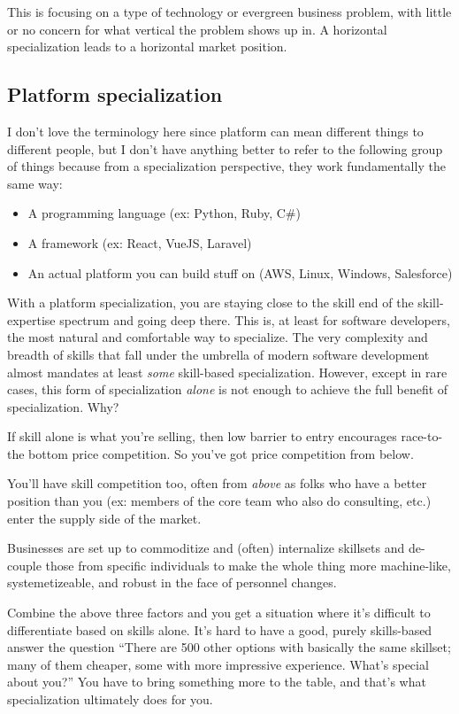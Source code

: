This is focusing on a type of technology or evergreen business problem, with little or no concern for what vertical the problem shows up in. A horizontal specialization leads to a horizontal market position.

\subsection{Platform specialization}

I don't love the terminology here since platform can mean different things to different people, but I don't have anything better to refer to the following group of things because from a specialization perspective, they work fundamentally the same way:

\begin{itemize}
\item A programming language (ex: Python, Ruby, C\#)
\item A framework (ex: React, VueJS, Laravel)
\item An actual platform you can build stuff on (AWS, Linux, Windows, Salesforce)
\end{itemize}

With a platform specialization, you are staying close to the skill end of the skill-expertise spectrum and going deep there. This is, at least for software developers, the most natural and comfortable way to specialize. The very complexity and breadth of skills that fall under the umbrella of modern software development almost mandates at least \emph{some} skill-based specialization. However, except in rare cases, this form of specialization \emph{alone} is not enough to achieve the full benefit of specialization. Why?

If skill alone is what you're selling, then low barrier to entry encourages race-to-the bottom price competition. So you've got price competition from below.

You'll have skill competition too, often from \emph{above} as folks who have a better position than you (ex: members of the core team who also do consulting, etc.) enter the supply side of the market.

Businesses are set up to commoditize and (often) internalize skillsets and de-couple those from specific individuals to make the whole thing more machine-like, systemetizeable, and robust in the face of personnel changes.

Combine the above three factors and you get a situation where it's difficult to differentiate based on skills alone. It's hard to have a good, purely skills-based answer the question ``There are 500 other options with basically the same skillset; many of them cheaper, some with more impressive experience. What's special about you?'' You have to bring something more to the table, and that's what specialization ultimately does for you.

